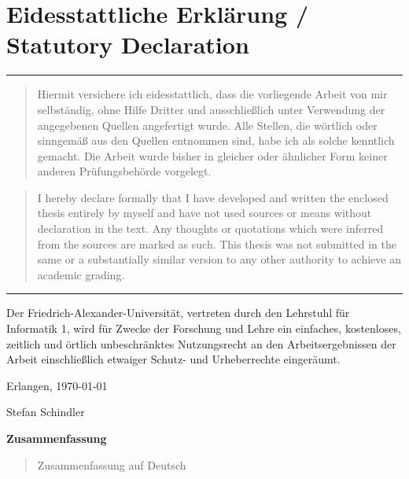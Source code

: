 \documentclass[10pt, a4paper, twoside, headsepline]{scrbook}
\renewcommand{\_}{\origunderscore\allowbreak}
\begin{document}
\section*{Eidesstattliche Erklärung / Statutory Declaration}

\vspace{0.1cm}
\noindent\hrule
\begin{quote}
Hiermit versichere ich eidesstattlich, dass die vorliegende Arbeit von mir
selbständig, ohne Hilfe Dritter und ausschließlich unter Verwendung der
angegebenen Quellen angefertigt wurde. Alle Stellen, die wörtlich oder
sinngemäß aus den Quellen entnommen sind, habe ich als solche kennt\-lich
gemacht. Die Arbeit wurde bisher in gleicher oder ähnlicher Form keiner anderen
Prüfungsbehörde vorgelegt.
\end{quote}

\begin{quote}
I hereby declare formally that I have developed and written the enclosed thesis
entirely by myself and have not used sources or means without declaration in
the text. Any thoughts or quotations which were inferred from the sources are
marked as such. This thesis was not submitted in the same or a substantially
similar version to any other authority to achieve an academic grading.
\end{quote}
\noindent\hrule

\vspace{0.5cm}
\noindent
Der Friedrich-Alexander-Universität, vertreten durch den Lehrstuhl
für Informatik 1, wird für Zwecke der Forschung und Lehre ein
einfaches, kostenloses, zeitlich und örtlich unbeschränktes
Nutzungsrecht an den Arbeitsergebnissen der Arbeit einschließlich
etwaiger Schutz- und Urheberrechte eingeräumt.

\vspace{0.5cm}
\noindent
Erlangen, \today

\vspace{1cm}
\begin{flushright}
Stefan Schindler \quad\null
\end{flushright}
\cleardoublepage

\vspace*{\fill}
\begin{center}
{\large\textbf{Zusammenfassung}}
\end{center}

\begin{quote}
Zusammenfassung auf Deutsch
\end{quote}
\end{document}
